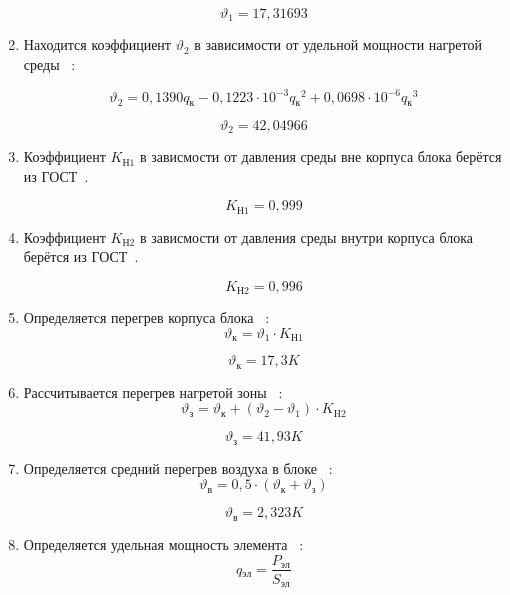 \begin{enumerate}[label={\arabic*.}]
$$\vartheta_1=17,31693$$

\item Находится коэффициент $\vartheta_2$ в зависимости от удельной мощности нагретой среды ~\cite{Rotkop1976}:

\begin{equation}
\vartheta_2 = 0,1390q\mathrm{_к} - 0,1223 \cdot 10^{-3}q\mathrm{_к}^2 + 0,0698 \cdot 10^{-6}q\mathrm{_к}^3
\end{equation}

$$\vartheta_2= 42,04966$$

\item Коэффициент $K\mathrm{_{Н1}}$ в зависмости от давления
  среды вне корпуса блока берётся из ГОСТ~\cite{GOST-15150-69}.

  $$K\mathrm{_{Н1}} = 0,999$$

  \item Коэффициент $K\mathrm{_{Н2}}$ в зависмости от давления
  среды внутри корпуса блока берётся из ГОСТ~\cite{GOST-15150-69}.

  $$K\mathrm{_{Н2}} = 0,996$$

\item Определяется перегрев корпуса блока ~\cite{Rotkop1976}:
  \begin{equation}
    \vartheta\mathrm{_к} = \vartheta_1 \cdot K\mathrm{_{Н1}}
  \end{equation}
  
  $$\vartheta\mathrm{_к} = 17,3 K$$

\item Рассчитывается перегрев нагретой зоны ~\cite{Rotkop1976}:
    \begin{equation}
    \vartheta\mathrm{_з} = \vartheta\mathrm{_к} + (\vartheta_2 - \vartheta_1) \cdot K\mathrm{_{H2}}
    \end{equation}

    $$\vartheta\mathrm{_з} = 41,93 K$$

  \item Определяется средний перегрев воздуха в блоке ~\cite{Rotkop1976}:
        \begin{equation}
      \vartheta\mathrm{_в} = 0,5 \cdot (\vartheta\mathrm{_к} + \vartheta\mathrm{_з})
    \end{equation}

    $$\vartheta\mathrm{_в} = 2,323 K$$

  \item Определяется удельная мощность элемента ~\cite{Rotkop1976}:
    \begin{equation}
      q\mathrm{_{эл}} = \frac{P\mathrm{_{эл}}}{S\mathrm{_{эл}}}
    \end{equation}


\end{enumerate}
